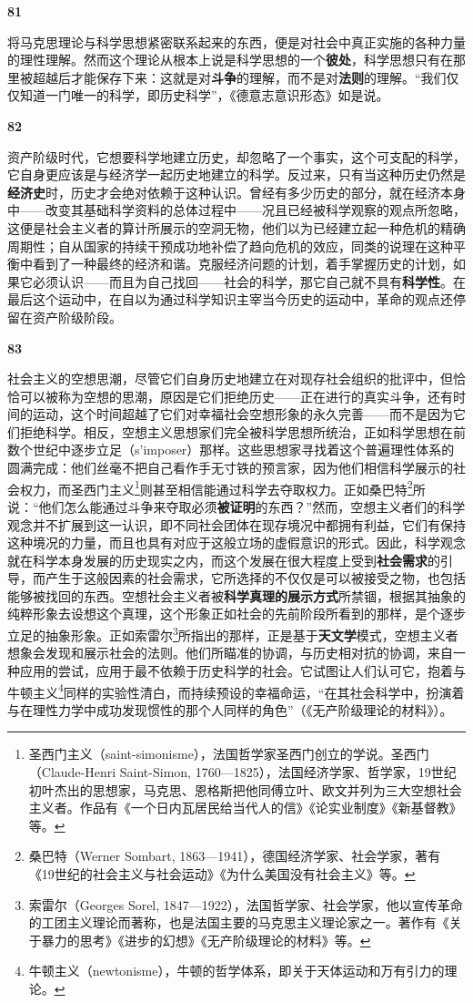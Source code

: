 \documentclass[fontset=fandol, a4paper, 12pt, openright]{ctexbook}
\makeatletter
\newcommand{\thesis}[1]{%
    \par\vspace{1.5em}%
    {\centering \textbf{\Large #1}\par}%
    \nobreak\vspace{0.5em}\nobreak
    \@afterindenttrue %
    \@afterheading    %
}
\makeatother
\begin{document}
\thesis{81}
将马克思理论与科学思想紧密联系起来的东西，便是对社会中真正实施的各种力量的理性理解。然而这个理论从根本上说是科学思想的一个\textbf{彼处}，科学思想只有在那里被超越后才能保存下来：这就是对\textbf{斗争}的理解，而不是对\textbf{法则}的理解。“我们仅仅知道一门唯一的科学，即历史科学”，《德意志意识形态》如是说。

\thesis{82}
资产阶级时代，它想要科学地建立历史，却忽略了一个事实，这个可支配的科学，它自身更应该是与经济学一起历史地建立的科学。反过来，只有当这种历史仍然是\textbf{经济史}时，历史才会绝对依赖于这种认识。曾经有多少历史的部分，就在经济本身中——改变其基础科学资料的总体过程中——况且已经被科学观察的观点所忽略，这便是社会主义者的算计所展示的空洞无物，他们以为已经建立起一种危机的精确周期性；自从国家的持续干预成功地补偿了趋向危机的效应，同类的说理在这种平衡中看到了一种最终的经济和谐。克服经济问题的计划，着手掌握历史的计划，如果它必须认识——而且为自己找回——社会的科学，那它自己就不具有\textbf{科学性}。在最后这个运动中，在自以为通过科学知识主宰当今历史的运动中，革命的观点还停留在资产阶级阶段。

\thesis{83}
社会主义的空想思潮，尽管它们自身历史地建立在对现存社会组织的批评中，但恰恰可以被称为空想的思潮，原因是它们拒绝历史——正在进行的真实斗争，还有时间的运动，这个时间超越了它们对幸福社会空想形象的永久完善——而不是因为它们拒绝科学。相反，空想主义思想家们完全被科学思想所统治，正如科学思想在前数个世纪中逐步立足（s'imposer）那样。这些思想家寻找着这个普遍理性体系的圆满完成：他们丝毫不把自己看作手无寸铁的预言家，因为他们相信科学展示的社会权力，而圣西门主义\footnote{圣西门主义（saint-simonisme），法国哲学家圣西门创立的学说。圣西门（Claude-Henri Saint-Simon, 1760—1825），法国经济学家、哲学家，19世纪初叶杰出的思想家，马克思、恩格斯把他同傅立叶、欧文并列为三大空想社会主义者。作品有《一个日内瓦居民给当代人的信》《论实业制度》《新基督教》等。}则甚至相信能通过科学去夺取权力。正如桑巴特\footnote{桑巴特（Werner Sombart, 1863—1941），德国经济学家、社会学家，著有《19世纪的社会主义与社会运动》《为什么美国没有社会主义》等。}所说：“他们怎么能通过斗争来夺取必须\textbf{被证明}的东西？”然而，空想主义者们的科学观念并不扩展到这一认识，即不同社会团体在现存境况中都拥有利益，它们有保持这种境况的力量，而且也具有对应于这般立场的虚假意识的形式。因此，科学观念就在科学本身发展的历史现实之内，而这个发展在很大程度上受到\textbf{社会需求}的引导，而产生于这般因素的社会需求，它所选择的不仅仅是可以被接受之物，也包括能够被找回的东西。空想社会主义者被\textbf{科学真理的展示方式}所禁锢，根据其抽象的纯粹形象去设想这个真理，这个形象正如社会的先前阶段所看到的那样，是个逐步立足的抽象形象。正如索雷尔\footnote{索雷尔（Georges Sorel, 1847—1922），法国哲学家、社会学家，他以宣传革命的工团主义理论而著称，也是法国主要的马克思主义理论家之一。著作有《关于暴力的思考》《进步的幻想》《无产阶级理论的材料》等。}所指出的那样，正是基于\textbf{天文学}模式，空想主义者想象会发现和展示社会的法则。他们所瞄准的协调，与历史相对抗的协调，来自一种应用的尝试，应用于最不依赖于历史科学的社会。它试图让人们认可它，抱着与牛顿主义\footnote{牛顿主义（newtonisme），牛顿的哲学体系，即关于天体运动和万有引力的理论。}同样的实验性清白，而持续预设的幸福命运，“在其社会科学中，扮演着与在理性力学中成功发现惯性的那个人同样的角色”（《无产阶级理论的材料》）。
\end{document}
